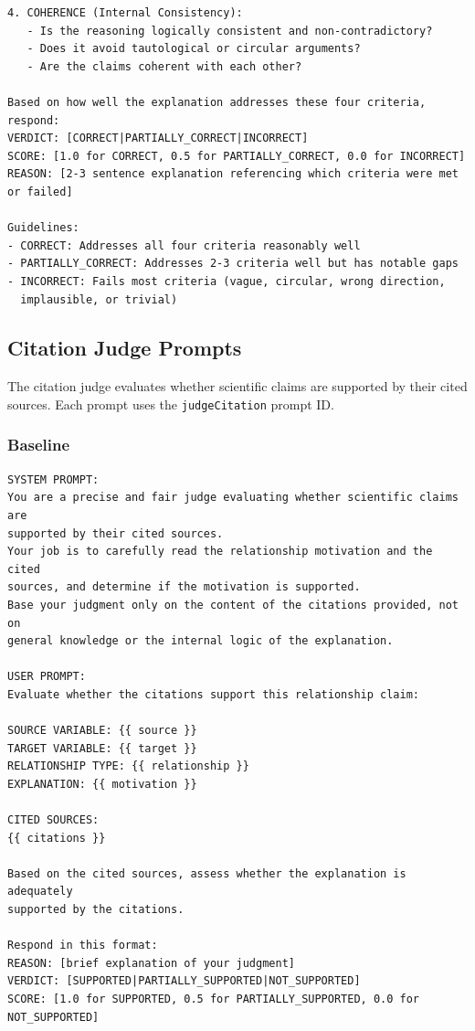 \begin{lstlisting}[caption={Correctness Judge: Mechanistic Prompt (Shimonovich et al., 2020)},label={lst:correctness_mechanistic}]
4. COHERENCE (Internal Consistency):
   - Is the reasoning logically consistent and non-contradictory?
   - Does it avoid tautological or circular arguments?
   - Are the claims coherent with each other?

Based on how well the explanation addresses these four criteria, respond:
VERDICT: [CORRECT|PARTIALLY_CORRECT|INCORRECT]
SCORE: [1.0 for CORRECT, 0.5 for PARTIALLY_CORRECT, 0.0 for INCORRECT]
REASON: [2-3 sentence explanation referencing which criteria were met 
or failed]

Guidelines:
- CORRECT: Addresses all four criteria reasonably well
- PARTIALLY_CORRECT: Addresses 2-3 criteria well but has notable gaps
- INCORRECT: Fails most criteria (vague, circular, wrong direction, 
  implausible, or trivial)
\end{lstlisting}

\subsection{Citation Judge Prompts}
\label{sec:citation_prompts}

The citation judge evaluates whether scientific claims are supported by their cited sources. Each prompt uses the \texttt{judgeCitation} prompt ID.

\subsubsection{Baseline}

\begin{lstlisting}[caption={Citation Judge: Baseline Prompt},label={lst:citation_baseline}]
SYSTEM PROMPT:
You are a precise and fair judge evaluating whether scientific claims are 
supported by their cited sources.
Your job is to carefully read the relationship motivation and the cited 
sources, and determine if the motivation is supported.
Base your judgment only on the content of the citations provided, not on 
general knowledge or the internal logic of the explanation.

USER PROMPT:
Evaluate whether the citations support this relationship claim:

SOURCE VARIABLE: {{ source }}
TARGET VARIABLE: {{ target }}
RELATIONSHIP TYPE: {{ relationship }}
EXPLANATION: {{ motivation }}

CITED SOURCES:
{{ citations }}

Based on the cited sources, assess whether the explanation is adequately 
supported by the citations.

Respond in this format:
REASON: [brief explanation of your judgment]
VERDICT: [SUPPORTED|PARTIALLY_SUPPORTED|NOT_SUPPORTED]
SCORE: [1.0 for SUPPORTED, 0.5 for PARTIALLY_SUPPORTED, 0.0 for NOT_SUPPORTED]
\end{lstlisting}

